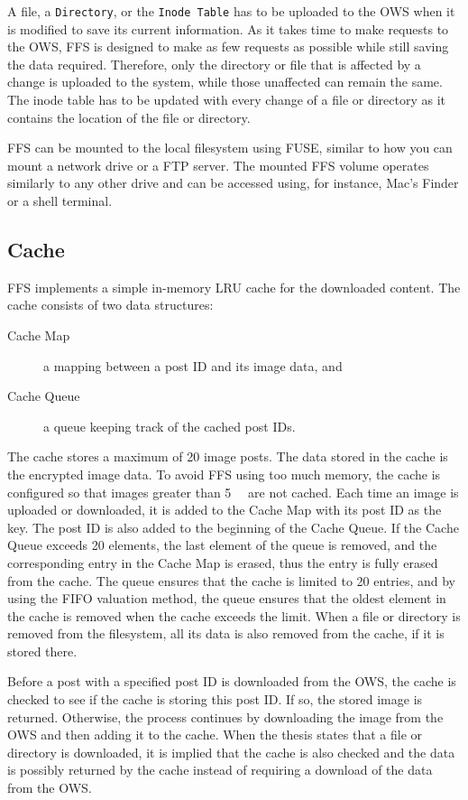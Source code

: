 A file, a \texttt{Directory}, or the \texttt{Inode Table} has to be uploaded to the \gls{OWS} when it is modified to save its current information. As it takes time to make requests to the \gls{OWS}, \gls{FFS} is designed to make as few requests as possible while still saving the data required. Therefore, only the directory or file that is affected by a change is uploaded to the system, while those unaffected can remain the same. The inode table has to be updated with every change of a file or directory as it contains the location of the file or directory.

\gls{FFS} can be mounted to the local filesystem using \gls{FUSE}, similar to how you can mount a network drive or a \gls{FTP} server. The mounted \gls{FFS} volume operates similarly to any other drive and can be accessed using, for instance, Mac's Finder or a shell terminal.

\subsection{Cache}
\gls{FFS} implements a simple \mbox{in-memory} \gls{LRU} cache for the downloaded content. The cache consists of two data structures: 
\begin{description}
	\item[Cache Map] a mapping between a post ID and its image data, and
	\item[Cache Queue] a queue keeping track of the cached post IDs.
\end{description}
The cache stores a maximum of 20 image posts. The data stored in the cache is the encrypted image data. To avoid \gls{FFS} using too much memory, the cache is configured so that images greater than \SI{5}{\mega\byte} are not cached. Each time an image is uploaded or downloaded, it is added to the Cache Map with its post ID as the key. The post ID is also added to the beginning of the Cache Queue. If the Cache Queue exceeds 20 elements, the last element of the queue is removed, and the corresponding entry in the Cache Map is erased, thus the entry is fully erased from the cache. The queue ensures that the cache is limited to 20 entries, and by using the \gls{FIFO} valuation method, the queue ensures that the oldest element in the cache is removed when the cache exceeds the limit. When a file or directory is removed from the filesystem, all its data is also removed from the cache, if it is stored there.

Before a post with a specified post ID is downloaded from the \gls{OWS}, the cache is checked to see if the cache is storing this post ID. If so, the stored image is returned. Otherwise, the process continues by downloading the image from the \gls{OWS} and then adding it to the cache. When the thesis states that a file or directory is downloaded, it is implied that the cache is also checked and the data is possibly returned by the cache instead of requiring a download of the data from the \gls{OWS}.

